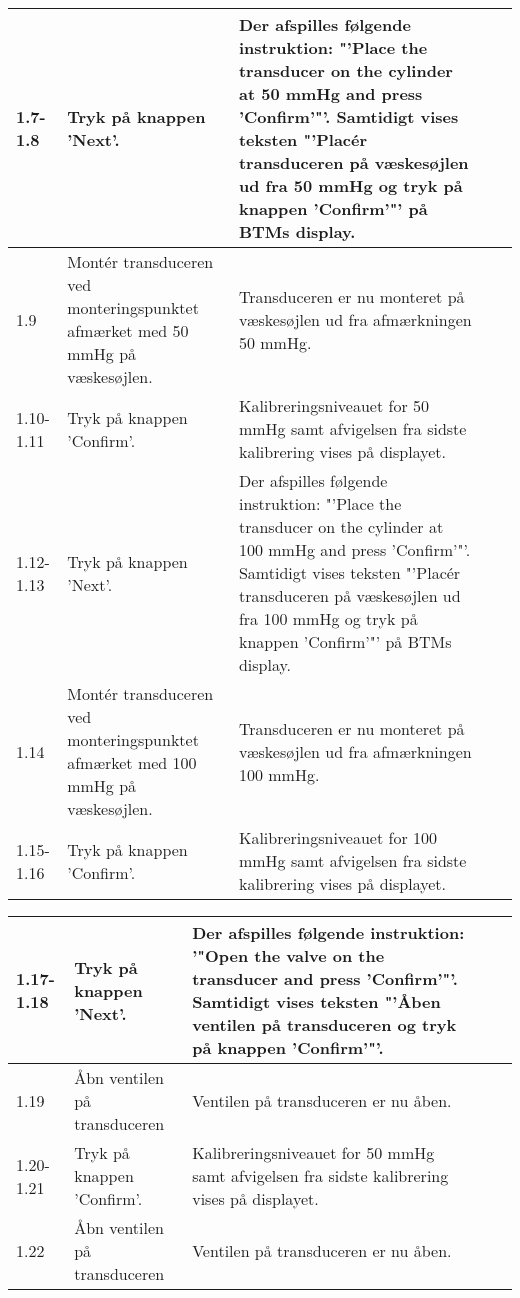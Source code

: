 \begin{tabular}{|p{1cm}|p{3cm}|p{4cm}|p{4cm}|p{2cm}|}
\hline
1.7-1.8 & Tryk på knappen 'Next'. & Der afspilles følgende instruktion: "'Place the transducer on the cylinder at 50 mmHg and press 'Confirm'"'. Samtidigt vises teksten "'Placér transduceren på væskesøjlen ud fra 50 mmHg og tryk på knappen 'Confirm'"' på BTMs display. &  & \\\hline

1.9 & Montér transduceren ved monteringspunktet afmærket med 50 mmHg på væskesøjlen. & Transduceren er nu monteret på væskesøjlen ud fra afmærkningen 50 mmHg. &  & \\\hline

1.10-1.11 & Tryk på knappen 'Confirm'. & Kalibreringsniveauet for 50 mmHg samt afvigelsen fra sidste kalibrering vises på displayet. &  & \\\hline

1.12-1.13 & Tryk på knappen 'Next'. & Der afspilles følgende instruktion: "'Place the transducer on the cylinder at 100 mmHg and press 'Confirm'"'. Samtidigt vises teksten "'Placér transduceren på væskesøjlen ud fra 100 mmHg og tryk på knappen 'Confirm'"' på BTMs display. &  & \\\hline

1.14 & Montér transduceren ved monteringspunktet afmærket med 100 mmHg på væskesøjlen. & Transduceren er nu monteret på væskesøjlen ud fra afmærkningen 100 mmHg. & &  \\\hline

1.15-1.16 & Tryk på knappen 'Confirm'. & Kalibreringsniveauet for 100 mmHg samt afvigelsen fra sidste kalibrering vises på displayet. &  & \\\hline
\end{tabular}

\begin{tabular}{|p{1cm}|p{3cm}|p{4cm}|p{4cm}|p{2cm}|}
\hline
1.17-1.18 & Tryk på knappen 'Next'. & Der afspilles følgende instruktion: '"Open the valve on the transducer and press 'Confirm'"'. Samtidigt vises teksten "'Åben ventilen på transduceren og tryk på knappen 'Confirm'"'. &  & \\\hline

1.19 & Åbn ventilen på transduceren & Ventilen på transduceren er nu åben. &  & \\\hline

1.20-1.21 & Tryk på knappen 'Confirm'. & Kalibreringsniveauet for 50 mmHg samt afvigelsen fra sidste kalibrering vises på displayet. &  & \\\hline

1.22 & Åbn ventilen på transduceren & Ventilen på transduceren er nu åben. &  & \\\hline

\end{tabular}


